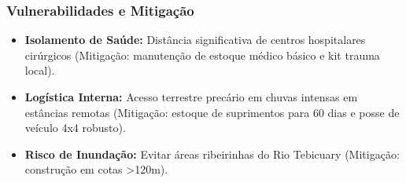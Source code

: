 \subsubsection{Vulnerabilidades e
Mitigação}

\begin{itemize}
\tightlist
\item
  \textbf{Isolamento de Saúde:} Distância significativa de centros
  hospitalares cirúrgicos (Mitigação: manutenção de estoque médico
  básico e kit trauma local).
\item
  \textbf{Logística Interna:} Acesso terrestre precário em chuvas
  intensas em estâncias remotas (Mitigação: estoque de suprimentos para
  60 dias e posse de veículo 4x4 robusto).
\item
  \textbf{Risco de Inundação:} Evitar áreas ribeirinhas do Rio Tebicuary
  (Mitigação: construção em cotas \textgreater120m).
\end{itemize}

